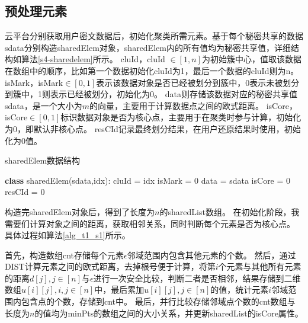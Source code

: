 \subsection{预处理元素}
云平台分别获取用户密文数据后，初始化聚类所需元素。基于每个秘密共享的数据sdata分别构造sharedElem对象，sharedElem内的所有值均为秘密共享值，详细结构如算法\ref{s4-sharedelem}所示。
cluId，cluId $ \in [1, n]$为初始簇中心，值取该数据在数组中的顺序，比如第一个数据初始化cluId为1，最后一个数据的cluId则为n。
isMark，isMark$ \in [0,1] $表示该数据对象是否已经被划分到簇中，0表示未被划分到簇中，1则表示已经被划分，初始化为0。
data则存储该数据对应的秘密共享值sdata，是一个大小为$ m $的向量，主要用于计算数据点之间的欧式距离。
isCore，isCore$ \in[0,1]$标识数据对象是否为核心点，主要用于在聚类时参与计算，初始化为0，即默认非核心点。
resCId记录最终划分结果，在用户还原结果时使用，初始化为0值。


\begin{algorithm}
	\caption{sharedElem数据结构}
	\label{s4-sharedelem}
	\begin{algorithmic}[1]
		\STATE \textbf{class} sharedElem(sdata,idx):
		\STATE \hspace{\algorithmicindent} cluId = idx
		\STATE \hspace{\algorithmicindent} isMark = 0
		\STATE \hspace{\algorithmicindent} data = sdata
		\STATE \hspace{\algorithmicindent} isCore = 0
		\STATE \hspace{\algorithmicindent} resCId = 0
	\end{algorithmic}
\end{algorithm}

构造完sharedElem对象后，得到了长度为$ n $的sharedList数组。
在初始化阶段，我需要们计算对象之间的距离，获取相邻关系，同时判断每个元素是否为核心点。
具体过程如算法\ref{alg_t1_s1}所示。

首先，构造数组cnt存储每个元素$ \epsilon $邻域范围内包含其他元素的个数。
然后，通过DIST计算元素之间的欧式距离，去掉根号便于计算，将第$ i $个元素与其他所有元素的距离$ d[j],j\in[n] $与$ \epsilon $进行一次安全比较，判断二者是否相邻，结果存储到二维数组$ u[i][j],i,j\in[n] $中，最后累加$ u[i][j],j\in[n]$的值，统计元素$ i $邻域范围内包含点的个数，存储到cnt中。
最后，并行比较存储邻域点个数的cnt数组与长度为$ n $的值均为minPts的数组之间的大小关系，并更新sharedList的isCore属性。

